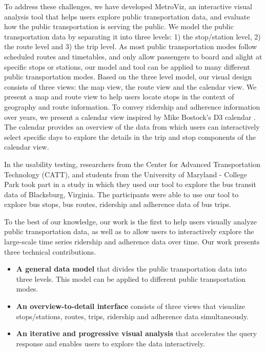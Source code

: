 \documentclass[journal]{vgtc}                %
\begin{document}
To address these challenges, we have developed MetroViz, an interactive visual analysis tool that helps users explore public transportation data, and evaluate how the public transportation is serving the public. 
We model the public transportation data by separating it into three levels: 1) the stop/station level, 2) the route level and 3) the trip level. As most public transportation modes follow scheduled routes and timetables, and only allow passengers to board and alight at specific stops or stations, our model and tool can be applied to many different public transportation modes.
Based on the three level model, our visual design consists of three views: the map view, the route view and the calendar view.
We present a map and route view to help users locate stops in the context of geography and route information. To convey ridership and adherence information over years, we present a calendar view inspired by Mike Bostock's D3 calendar \cite{d3calendar}. The calendar provides an overview of the data from which users can interactively select specific days to explore the details in the trip and stop components of the calendar view.

In the usability testing, researchers from the Center for Advanced Transportation Technology (CATT), and students from the University of Maryland - College Park took part in a study in which they used our tool to explore the bus transit data of Blacksburg, Virginia. The participants were able to use our tool to explore bus stops, bus routes, ridership and adherence data of bus trips.

To the best of our knowledge, our work is the first to help users visually analyze public transportation data, as well as to allow users to interactively explore the large-scale time series ridership and adherence data over time. Our work presents three technical contributions.

\begin{itemize}
  \item \textbf{A general data model} that divides the public transportation data into three levels. This model can be applied to different public transportation modes.
  \item \textbf{An overview-to-detail interface} consists of three views that visualize stops/stations, routes, trips, ridership and adherence data simultaneously.
  \item \textbf{An iterative and progressive visual analysis} that accelerates the query response and enables users to explore the data interactively.
\end{itemize}
\end{document}
